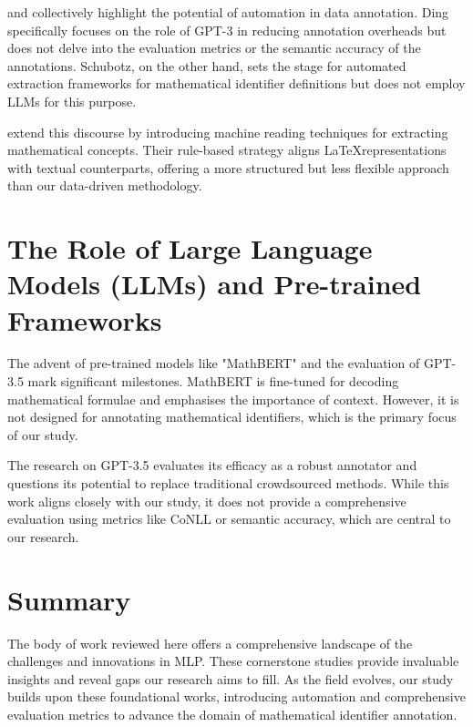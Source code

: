 \citet{ding2022gpt} and \citet{schubotz2017evaluating} collectively highlight the potential of automation in data annotation. Ding specifically focuses on the role of GPT-3 in reducing annotation overheads but does not delve into the evaluation metrics or the semantic accuracy of the annotations. Schubotz, on the other hand, sets the stage for automated extraction frameworks for mathematical identifier definitions but does not employ \ac{LLMs} for this purpose.

\citet{alexeeva2020mathalign} extend this discourse by introducing machine reading techniques for extracting mathematical concepts. Their rule-based strategy aligns \LaTeX \space representations with textual counterparts, offering a more structured but less flexible approach than our data-driven methodology.

\section{The Role of Large Language Models (LLMs) and Pre-trained Frameworks}

The advent of pre-trained models like "MathBERT" \citep{peng2021mathbert} and the evaluation of GPT-3.5 \citep{he2023annollm} mark significant milestones. MathBERT is fine-tuned for decoding mathematical formulae and emphasises the importance of context. However, it is not designed for annotating mathematical identifiers, which is the primary focus of our study.

The research on GPT-3.5 evaluates its efficacy as a robust annotator and questions its potential to replace traditional crowdsourced methods. While this work aligns closely with our study, it does not provide a comprehensive evaluation using metrics like CoNLL or semantic accuracy, which are central to our research.

\section{Summary}

The body of work reviewed here offers a comprehensive landscape of the challenges and innovations in MLP. These cornerstone studies provide invaluable insights and reveal gaps our research aims to fill. As the field evolves, our study builds upon these foundational works, introducing automation and comprehensive evaluation metrics to advance the domain of mathematical identifier annotation.
